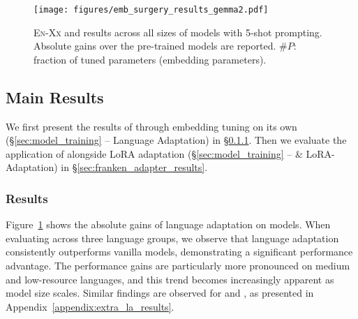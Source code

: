 \begin{figure}
    \setlength{\abovecaptionskip}{-0.0001cm}
    \setlength{\belowcaptionskip}{-0.5cm}
    \centering
    \texttt{[image: figures/emb\_surgery\_results\_gemma2.pdf]}
    \vspace{-6mm}
    \caption{\flores \textsc{En-Xx} and \belebele \la results across all sizes of \gemmatwo models with 5-shot prompting. Absolute gains over the pre-trained models are reported. $\#P$: fraction of tuned parameters (\ie embedding parameters).}
    \vspace{-6mm}
    \label{fig:gemma_results}
\end{figure}

\subsection{Main Results}
We first present the results of \la through embedding tuning on its own (\S\ref{sec:model_training} -- Language Adaptation) in \S\ref{sec:embed_surgery_results}. Then we evaluate the application of \ouradapter alongside LoRA adaptation (\S\ref{sec:model_training} -- \ouradapter \& LoRA-Adaptation) in \S\ref{sec:franken_adapter_results}.



\subsubsection{\la Results}\label{sec:embed_surgery_results}

Figure~\ref{fig:gemma_results} shows the absolute gains of language adaptation on \gemmatwo models. When evaluating across three language groups, we observe that language adaptation consistently outperforms vanilla \gemmatwo models, demonstrating a significant performance advantage. The performance gains are particularly more pronounced on medium and low-resource languages, and this trend becomes increasingly apparent as model size scales. Similar findings are observed for \aya and \palmtwo, as presented in Appendix~\ref{appendix:extra_la_results}.




